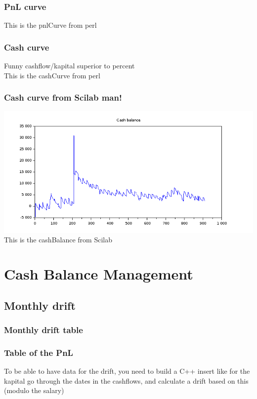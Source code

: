 \documentclass[8pt]{article} %
\begin{document}
\subsubsection{PnL curve}

This is the pnlCurve from perl
%

\subsubsection{Cash curve}

Funny cashflow/kapital superior to percent\\


This is the cashCurve from perl

\subsubsection{Cash curve from Scilab man!}
\includegraphics[scale=0.6]{Scilab-cashBalance.png}
This is the cashBalance from Scilab 

\section{Cash Balance Management}

\subsection{Monthly drift}

\subsubsection{Monthly drift table}
%


\subsubsection{Table of the PnL}

To be able to have data for the drift, you need to build a C++ insert like for the kapital
go through the dates in the cashflows, and calculate a drift based on this (modulo the salary) 
\end{document}
